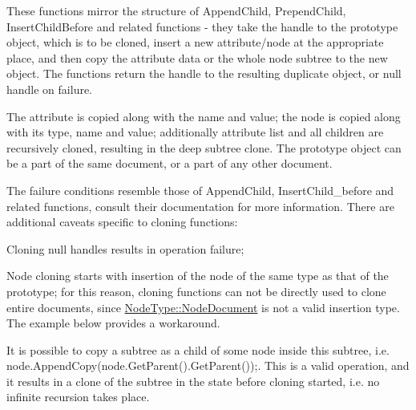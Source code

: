 These functions mirror the structure of AppendChild, PrependChild, InsertChildBefore and related functions -\/ they take the handle to the prototype object, which is to be cloned, insert a new attribute/node at the appropriate place, and then copy the attribute data or the whole node subtree to the new object. The functions return the handle to the resulting duplicate object, or null handle on failure. \par
 \par
 The attribute is copied along with the name and value; the node is copied along with its type, name and value; additionally attribute list and all children are recursively cloned, resulting in the deep subtree clone. The prototype object can be a part of the same document, or a part of any other document. \par
 \par
 The failure conditions resemble those of AppendChild, InsertChild\_\-before and related functions, consult their documentation for more information. There are additional caveats specific to cloning functions:
\begin{DoxyItemize}
\item Cloning null handles results in operation failure;
\item Node cloning starts with insertion of the node of the same type as that of the prototype; for this reason, cloning functions can not be directly used to clone entire documents, since \hyperlink{namespaceMezzanine_1_1xml_a524d867e34ff408b8f45a51b7924cb80}{NodeType::NodeDocument} is not a valid insertion type. The example below provides a workaround.
\item It is possible to copy a subtree as a child of some node inside this subtree, i.e. node.AppendCopy(node.GetParent().GetParent());. This is a valid operation, and it results in a clone of the subtree in the state before cloning started, i.e. no infinite recursion takes place.
\end{DoxyItemize}

